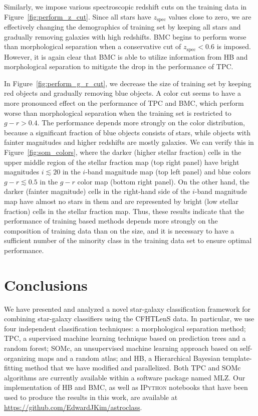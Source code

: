 Similarly, we impose various spectroscopic redshift cuts 
on the training data in Figure~\ref{fig:perform_z_cut}.
Since all stars have $z_{\mathrm{spec}}$ values
close to zero, we are effectively changing the demographics
of training set by keeping all stars and gradually removing
galaxies with high redshifts.
BMC begins to perform worse than morphological separation
when a conservative cut of $z_{\mathrm{spec}} < 0.6$ is imposed.
However, it is again clear that BMC is able to
utilize information from HB and morphological separation to
mitigate the drop in the performance of TPC.

In Figure~\ref{fig:perform_g_r_cut},
we decrease the size of training set
by keeping red objects and gradually removing blue objects.
A color cut seems to have a more pronounced effect
on the performance of TPC and BMC,
which perform worse than morphological separation
when the training set is restricted to $g - r > 0.4$.
The performance depends more strongly on the color distribution, because 
a significant fraction of blue objects consists of stars,
while objects with fainter magnitudes and higher redshifts
are mostly galaxies.
We can verify this in Figure~\ref{fig:som_colors},
where the darker (higher stellar fraction) cells in the upper middle region
of the stellar fraction map (top right panel)
have bright magnitudes $i \lesssim 20$
in the $i$-band magnitude map (top left panel)
and blue colors $g-r \lesssim 0.5$ in the $g-r$ color map (bottom right panel).
On the other hand, the darker (fainter magnitude) cells
in the right-hand side of the $i$-band magnitude map
have almost no stars in them and
are represented by bright (low stellar fraction)
cells in the stellar fraction map.
Thus, these results indicate that the performance of training based
methods depends more strongly on the composition of training data
than on the size, and it is necessary to have
a sufficient number of the minority class
in the training data set to ensure optimal performance.



\section{Conclusions}
  \label{section:conclusions}

We have presented and analyzed a novel star-galaxy classification framework
for combining star-galaxy classifiers using the CFHTLenS data.
In particular, we use four independent classification techniques:
a morphological separation method;
TPC, a supervised machine learning technique
based on prediction trees and a random forest;
SOMc, an unsupervised machine learning approach
based on self-organizing maps and a random atlas;
and HB, a Hierarchical Bayesian template-fitting method
that we have modified and parallelized.
Both TPC and SOMc algorithms are currently available within
a software package named \textsc{MLZ}.
Our implementation of HB and BMC,
as well as \textsc{IPython} notebooks that have been used to
produce the results in this work,
are available at \url{https://github.com/EdwardJKim/astroclass}.  


